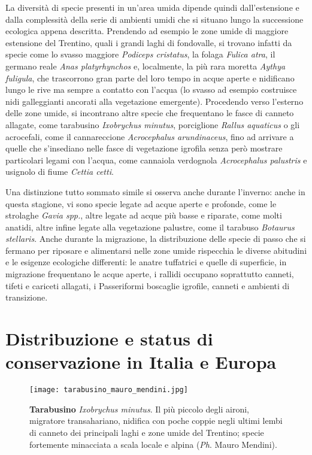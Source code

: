 \documentclass[10pt,twoside,openany,x11names,svgnames,italian,a5paper,dvipsnames,table]{memoir}
\newcommand{\ph}{\emph{Ph}. }
\begin{document}
La diversità di specie presenti in un’area umida dipende quindi dall’estensione e dalla complessità  della serie di ambienti umidi che si situano lungo la successione ecologica appena descritta. Prendendo ad esempio le zone umide di maggiore estensione del Trentino, quali i grandi laghi di fondovalle, si trovano infatti da specie come  lo svasso maggiore \emph{Podiceps cristatus}, la folaga \emph{Fulica atra}, il germano reale \emph{Anas platyrhynchos} e, localmente, la più rara moretta \emph{Aythya fuligula}, che trascorrono gran parte del loro tempo in acque aperte e nidificano lungo le rive ma sempre a contatto con l'acqua (lo svasso ad esempio costruisce nidi galleggianti ancorati alla vegetazione emergente). Procedendo verso l'esterno delle zone umide, si incontrano altre specie  che frequentano le fasce di canneto allagate, come tarabusino \emph{Ixobrychus minutus}, porciglione \emph{Rallus aquaticus} o gli acrocefali, come il cannareccione \emph{Acrocephalus arundinaceus}, fino ad arrivare a quelle che s’insediano nelle fasce di vegetazione igrofila senza però mostrare particolari legami con l'acqua, come cannaiola verdognola \emph{Acrocephalus palustris} e usignolo di fiume \emph{Cettia cetti}.

Una distinzione tutto sommato simile si osserva anche durante l'inverno: anche in questa stagione, vi sono specie legate ad acque aperte e profonde, come le strolaghe \emph{Gavia spp.}, altre legate ad acque più basse e riparate, come molti anatidi, altre infine legate alla vegetazione palustre, come il tarabuso \emph{Botaurus stellaris}.
Anche durante la migrazione, la distribuzione delle specie di passo che si fermano per riposare e alimentarsi nelle zone umide rispecchia le diverse abitudini e le esigenze ecologiche differenti: le anatre tuffatrici e quelle di superficie, in migrazione frequentano le acque aperte, i rallidi occupano soprattutto canneti, tifeti e cariceti allagati, i Passeriformi boscaglie igrofile, canneti e ambienti di transizione.


\section{Distribuzione e status di conservazione in Italia e Europa}

\begin{wrapfigure}[18]{r}{.6\textwidth}
\begin{center}
\vspace{-.7cm}
\texttt{[image: tarabusino\_mauro\_mendini.jpg]}
\caption*{\textbf{Tarabusino} \emph{Ixobrychus minutus}. Il più piccolo degli aironi, migratore transahariano, nidifica con poche coppie negli ultimi lembi di canneto dei principali laghi e zone umide del Trentino; specie fortemente minacciata a scala locale e alpina (\ph Mauro Mendini).}
\end{center}
\end{wrapfigure}
\end{document}
